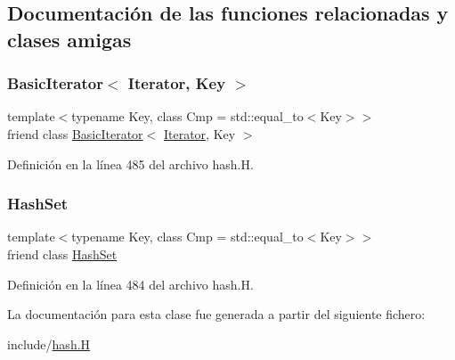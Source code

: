 \subsection{Documentación de las funciones relacionadas y clases amigas}
\mbox{\label{class_designar_1_1_hash_set_1_1_iterator_a0b375a570add16b09037ce1773f0ddbb}} 
\subsubsection{\texorpdfstring{Basic\+Iterator$<$ Iterator, Key $>$}{BasicIterator< Iterator, Key >}}
{\footnotesize\ttfamily template$<$typename Key, class Cmp = std\+::equal\+\_\+to$<$\+Key$>$$>$ \\
friend class \hyperlink{class_designar_1_1_basic_iterator}{Basic\+Iterator}$<$ \hyperlink{class_designar_1_1_hash_set_1_1_iterator}{Iterator}, Key $>$\hspace{0.3cm}{\ttfamily [friend]}}



Definición en la línea 485 del archivo hash.\+H.

\mbox{\label{class_designar_1_1_hash_set_1_1_iterator_ac5220f06200dc3b0d55d050a940f17b9}} 
\subsubsection{\texorpdfstring{Hash\+Set}{HashSet}}
{\footnotesize\ttfamily template$<$typename Key, class Cmp = std\+::equal\+\_\+to$<$\+Key$>$$>$ \\
friend class \hyperlink{class_designar_1_1_hash_set}{Hash\+Set}\hspace{0.3cm}{\ttfamily [friend]}}



Definición en la línea 484 del archivo hash.\+H.



La documentación para esta clase fue generada a partir del siguiente fichero\+:\begin{DoxyCompactItemize}
\item 
include/\hyperlink{hash_8_h}{hash.\+H}\end{DoxyCompactItemize}
